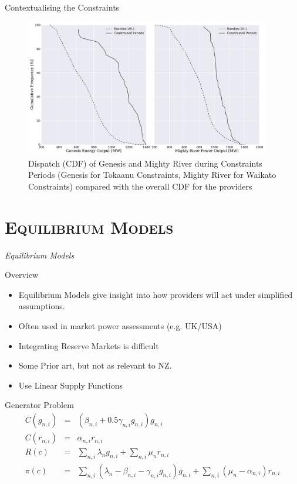 \documentclass[xcolor=x11names,compress]{beamer}
\renewcommand{\(}{\begin{columns}}
\renewcommand{\)}{\end{columns}}
\newcommand{\<}[1]{\begin{column}{#1}}
\renewcommand{\>}{\end{column}}
\begin{document}
\begin{frame}{Contextualising the Constraints}
\centering
\begin{figure}
\includegraphics[width=0.95\textwidth]{img/gen_mrp_output_vs_baseline.pdf}
\caption{Dispatch (CDF) of Genesis and Mighty River during Constraints Periods
(Genesis for Tokaanu Constraints, Mighty River for Waikato Constraints)
compared with the overall CDF for the providers}
\end{figure}
\end{frame}

\section{\scshape Equilibrium Models}
\begin{frame}
\vspace{1.5cm}
\begin{center}
{\Huge\textit{Equilibrium Models}}
\end{center}
\end{frame}

\begin{frame}{Overview}
\begin{itemize}
\item Equilibrium Models give insight into how providers will act under
simplified assumptions.
\item Often used in market power assessments (e.g. UK/USA)
\item Integrating Reserve Markets is difficult
\item Some Prior art, but not as relevant to NZ.
\item Use Linear Supply Functions
\end{itemize}
\end{frame}

\begin{frame}{Generator Problem}
\begin{eqnarray*}
C(g_{n,i}) &=& (\beta_{n,i} + 0.5\gamma_{n,i}g_{n,i})g_{n,i} \\
C(r_{n,i}) &=& \alpha_{n,i}r_{n,i} \\
R(c) &=& \sum_{n,i} \lambda_{n}g_{n,i} + \sum_{n,i} \mu_{n}r_{n,i} \\
\pi(c) &=& \sum_{n,i} (\lambda_{n} - \beta_{n,i} - \gamma_{n,i}g_{n,i})g_{n,i} + \sum_{n,i} (\mu_{n} - \alpha_{n,i})r_{n,i}
\end{eqnarray*}
\end{frame}
\end{document}
